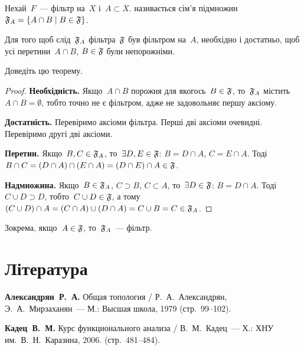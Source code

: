 \begin{definition}
    Нехай~$F$~--- фільтр на~$X$ і~$A \subset X$.  називається сім'я підмножин~$\frak F_A = \{ A \cap B \mid B \in \frak F\}$.
\end{definition}

\begin{theorem}
    \label{th:filter-restriction-criterion}
    Для того щоб слід~$\frak F_A$ фільтра~$\frak F$ був фільтром на~$A$, необхідно і достатньо, щоб усі перетини~$A \cap B$, $B \in \frak F$ були непорожніми.
\end{theorem}

\begin{exercise}
    Доведіть цю теорему.
\end{exercise}
\begin{proof}
    \textbf{Необхідність.} Якщо~$A \cap B$ порожня для якогось~$B \in \frak F$, то~$\frak F_A$ містить~$A \cap B = \emptyset$, тобто точно не є фільтром, адже не задовольняє першу аксіому. 
    
    \textbf{Достатність.} Перевіримо аксіоми фільтра. Перші дві аксіоми очевидні. Перевіримо другі дві аксіоми. 
    
    \textbf{Перетин.} Якщо~$B, C \in \frak F_A$, то~$\exists D, E \in \frak F$: $B = D \cap A$, $C = E \cap A$. Тоді~$B \cap C = (D \cap A) \cap (E \cap A) = (D \cap E) \cap A \in \frak F$. 
    
    \textbf{Надмножина.} Якщо~$B \in \frak F_A$, $C \supset B$, $C \subset A$, то~$\exists D \in \frak F$: $B = D \cap A$. Тоді~$C \cup D \supset D$, тобто~$C \cup D \in \frak F$, а тому~$(C \cup D) \cap A = (C \cap A) \cup (D \cap A) = C \cup B = C \in \frak F_A$.
\end{proof}

\begin{corollary}
    Зокрема, якщо~$A \in \frak F$, то~$\frak F_A$~--- фільтр.
\end{corollary}

\section{Література}

\begin{enumerate}[label={[\arabic*]}]
\item \textbf{Александрян~Р.~А.}
Общая топология /
Р.~А.~Александрян, Э.~А.~Мирзаханян~---
М.: Высшая школа, 1979 (стр.~99--102).
\item \textbf{Кадец~В.~М.}
Курс функционального анализа /
В.~М.~Кадец~---
Х.: ХНУ им.~В.~Н.~Каразина, 2006. (стр.~481--484).
\end{enumerate}
